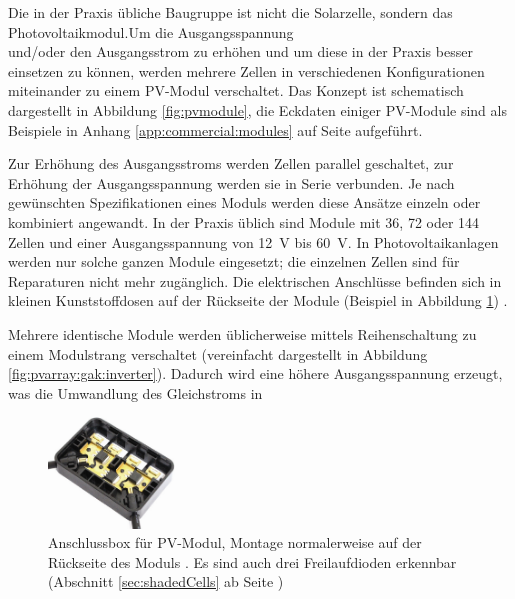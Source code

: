 Die  in der  Praxis  \"ubliche  Baugruppe ist  nicht  die Solarzelle,  sondern
das   Photovoltaikmodul.\hfill   Um   \hfill   die   \hfill   Ausgangsspannung
\\und/oder  den  Ausgangsstrom  zu  erh\"ohen  und  um  diese  in  der  Praxis
besser  einsetzen   zu  k\"onnen,  werden  mehrere   Zellen  in  verschiedenen
Konfigurationen  miteinander zu  einem PV-Modul  verschaltet. Das Konzept  ist
schematisch dargestellt in Abbildung  \ref{fig:pvmodule}, die Eckdaten einiger
PV-Module sind als Beispiele  in Anhang \ref{app:commercial:modules} auf Seite
\pageref{app:commercial:modules} aufgef\"uhrt.

Zur  Erh\"ohung  des Ausgangsstroms  werden  Zellen  parallel geschaltet,  zur
Erh\"ohung  der  Ausgangsspannung werden  sie  in  Serie verbunden.   Je  nach
gew\"unschten Spezifikationen eines Moduls werden diese Ans\"atze einzeln oder
kombiniert angewandt.  In der Praxis \"ublich  sind Module mit 36, 72 oder 144
Zellen und  einer Ausgangsspannung  von \SI{12}{\volt}  bis \SI{60}{\volt}. In
Photovoltaikanlagen werden nur solche  ganzen Module eingesetzt; die einzelnen
Zellen  sind  f\"ur  Reparaturen  nicht  mehr  zug\"anglich. Die  elektrischen
Anschl\"usse befinden sich in kleinen  Kunststoffdosen auf der R\"uckseite der
Module (Beispiel in Abbildung \ref{fig:pvJunctionBox}) \cite{ref:pv:baunetz}.


Mehrere  identische  Module  werden  \"ublicherweise  mittels  Reihenschaltung
zu  einem  Modulstrang  verschaltet   (vereinfacht  dargestellt  in  Abbildung
\ref{fig:pvarray:gak:inverter}).  Dadurch wird  eine h\"ohere Ausgangsspannung
erzeugt, was die Umwandlung des Gleichstroms in

\begin{figure}
    \centering
    \includegraphics[width=0.3\textwidth]{images/solar-facility/pvJunctionBox.jpeg}
    \caption[Anschlussbox PV-Modul]{
        Anschlussbox   f\"ur   PV-Modul,   Montage   normalerweise   auf   der
        R\"uckseite  des  Moduls  \cite{ref:junctionBox}. Es  sind  auch  drei
        Freilaufdioden  erkennbar  (Abschnitt \ref{sec:shadedCells}  ab  Seite
        \pageref{sec:shadedCells})%
    }
    \label{fig:pvJunctionBox}
\end{figure}

